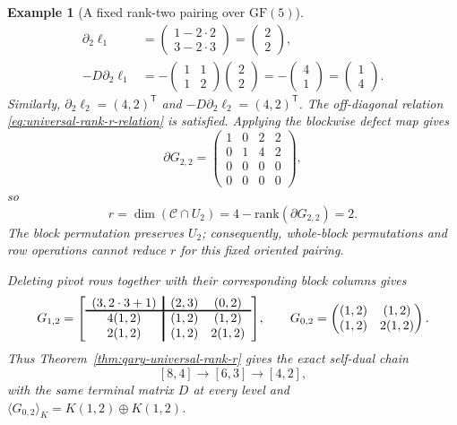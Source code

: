\documentclass[12pt]{article}
\newtheorem{example}{Example}[section]
\newcommand{\GF}[1]{\ensuremath{\mathrm{GF}(#1)}}
\newcommand{\rank}{\mathrm{rank}}
\begin{document}
\begin{example}[A fixed rank-two pairing over \(\GF{5}\)]
\[\begin{aligned}
\partial_2\ell_1
  &=\begin{pmatrix}1-2\cdot2\\3-2\cdot3\end{pmatrix}
    =\begin{pmatrix}2\\2\end{pmatrix},\\
-D\partial_2\ell_1
  &=-\begin{pmatrix}1&1\\1&2\end{pmatrix}
       \begin{pmatrix}2\\2\end{pmatrix}
    =-\begin{pmatrix}4\\1\end{pmatrix}
    =\begin{pmatrix}1\\4\end{pmatrix}.
\end{aligned}
\]
Similarly, \(\partial_2\ell_2=(4,2)^{\mathsf T}\) and
\(-D\partial_2\ell_2=(4,2)^{\mathsf T}\).
The off-diagonal relation
\eqref{eq:universal-rank-r-relation} is satisfied. Applying the blockwise
defect map gives
\[
\partial G_{2,2}=
\begin{pmatrix}
1&0&2&2\\
0&1&4&2\\
0&0&0&0\\
0&0&0&0
\end{pmatrix},
\]
so
\[
r=\dim(\mathcal C\cap U_2)=4-\rank(\partial G_{2,2})=2.
\]
The block permutation preserves \(U_2\); consequently, whole-block
permutations and row operations cannot reduce \(r\) for this fixed oriented
pairing.

Deleting pivot rows together with their corresponding block columns gives
\[
G_{1,2}=
{\arrayrulewidth=1.2pt
\left[\begin{array}{c!{\vrule width 1.2pt}cc}
(3,2\cdot3+1)&(2,3)&(0,2)\\[-1pt]
\noalign{\hrule height 1.2pt}
4(1,2)&(1,2)&(1,2)\\
2(1,2)&(1,2)&2(1,2)
\end{array}\right]},\qquad
G_{0,2}=
\begin{pmatrix}
(1,2)&(1,2)\\
(1,2)&2(1,2)
\end{pmatrix}.
\]
Thus Theorem~\ref{thm:qary-universal-rank-r} gives the exact self-dual chain
\[
[8,4]\longrightarrow[6,3]\longrightarrow[4,2],
\]
with the same terminal matrix \(D\) at every level and
\(\langle G_{0,2}\rangle_K=K(1,2)\oplus K(1,2)\).
\end{example}
\end{document}
